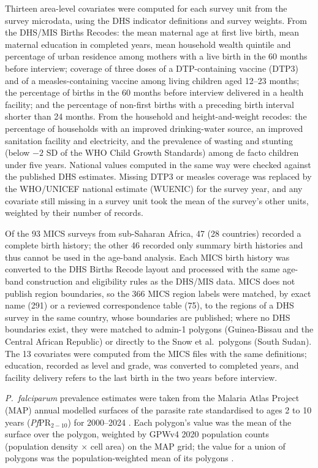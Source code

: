 Thirteen area-level covariates were computed for each survey unit from the survey microdata, using the DHS indicator definitions and survey weights. From the DHS/MIS Births Recodes: the mean maternal age at first live birth, mean maternal education in completed years, mean household wealth quintile and percentage of urban residence among mothers with a live birth in the 60 months before interview; coverage of three doses of a DTP-containing vaccine (DTP3) and of a measles-containing vaccine among living children aged 12--23 months; the percentage of births in the 60 months before interview delivered in a health facility; and the percentage of non-first births with a preceding birth interval shorter than 24 months. From the household and height-and-weight recodes: the percentage of households with an improved drinking-water source, an improved sanitation facility and electricity, and the prevalence of wasting and stunting (below $-2$ SD of the WHO Child Growth Standards) among de facto children under five years. National values computed in the same way were checked against the published DHS estimates. Missing DTP3 or measles coverage was replaced by the WHO/UNICEF national estimate (WUENIC) for the survey year, and any covariate still missing in a survey unit took the mean of the survey's other units, weighted by their number of records.

Of the 93 MICS surveys from sub-Saharan Africa, 47 (28 countries) recorded a complete birth history; the other 46 recorded only summary birth histories and thus cannot be used in the age-band analysis. Each MICS birth history was converted to the DHS Births Recode layout and processed with the same age-band construction and eligibility rules as the DHS/MIS data. MICS does not publish region boundaries, so the 366 MICS region labels were matched, by exact name (291) or a reviewed correspondence table (75), to the regions of a DHS survey in the same country, whose boundaries are published; where no DHS boundaries exist, they were matched to admin-1 polygons (Guinea-Bissau and the Central African Republic) or directly to the Snow et al.\ polygons (South Sudan). The 13 covariates were computed from the MICS files with the same definitions; education, recorded as level and grade, was converted to completed years, and facility delivery refers to the last birth in the two years before interview.

\emph{P.\ falciparum} prevalence estimates were taken from the Malaria Atlas Project (MAP) annual modelled surfaces of the parasite rate standardised to ages 2 to 10 years (\textit{Pf}PR$_{2-10}$) for 2000--2024 \cite{map,map2025}. Each polygon's value was the mean of the surface over the polygon, weighted by GPWv4 2020 population counts (population density $\times$ cell area) on the MAP grid; the value for a union of polygons was the population-weighted mean of its polygons \cite{gpwv4}.

